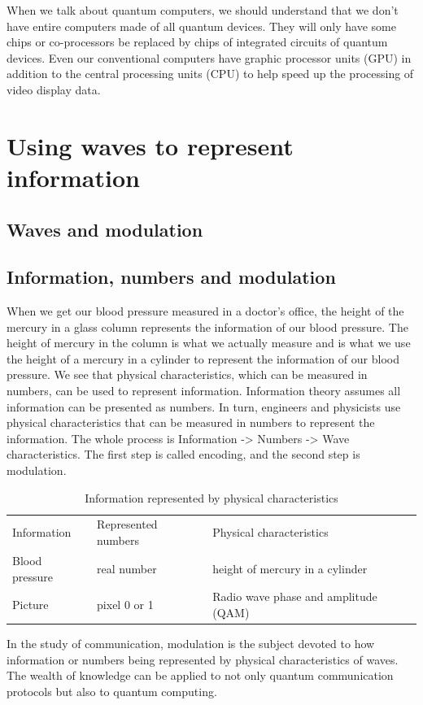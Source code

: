 \documentclass{book}
\begin{document}
When we talk about quantum computers, we should understand that we don't have entire computers made of all quantum devices. They will only have some chips or co-processors be replaced by chips of integrated circuits of quantum devices. Even our conventional computers have graphic processor units (GPU) in addition to the central processing units (CPU) to help speed up the processing of video display data.

\chapter{Using waves to represent information}

\section{Waves and modulation}

\section{Information, numbers and modulation}
When we get our blood pressure measured in a doctor's office, the height of the mercury in a glass column represents 
the information of our blood pressure. The height of mercury in the column is what we actually measure and is 
what we use the height of a mercury in a cylinder to represent the information of our blood pressure. We see that physical characteristics, which can be measured in numbers, can be used to represent information. Information theory assumes all information can be presented as numbers. In turn, engineers and physicists use physical characteristics that can be measured in numbers to represent the information. The whole process is
Information -> Numbers -> Wave characteristics. The first step is called encoding, and the second step is modulation.
\begin{table}[]
\caption{Information represented by physical characteristics}
\label{information-characteristics}
\begin{tabular}{lll}
Information &Represented numbers & Physical characteristics  \\
Blood pressure & real number & height of mercury in a cylinder \\
Picture & pixel 0 or 1 & Radio wave phase and amplitude (QAM)
\end{tabular}
\end{table}


In the study of communication, modulation is the subject devoted to how information or numbers being represented by physical characteristics of waves. The wealth of knowledge can be applied to not only quantum communication protocols but also to quantum computing.
\end{document}
